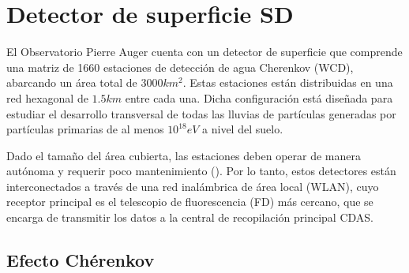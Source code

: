 \section{Detector de superficie SD}

El Observatorio Pierre Auger cuenta con un detector de superficie que comprende una matriz de 1660 estaciones de detección de agua Cherenkov (WCD), abarcando un área total de 3000$km^{2}$. Estas estaciones están distribuidas en una red hexagonal de $1.5km$ entre cada una. Dicha configuración está diseñada para estudiar el desarrollo transversal de todas las lluvias de partículas generadas por partículas primarias de al menos $10^{18} eV$ a nivel del suelo.

Dado el tamaño del área cubierta, las estaciones deben operar de manera autónoma y requerir poco mantenimiento (\cite{SD_auger}). Por lo tanto, estos detectores están interconectados a través de una red inalámbrica de área local (WLAN), cuyo receptor principal es el telescopio de fluorescencia (FD) más cercano, que se encarga de transmitir los datos a la central de recopilación principal CDAS.

\subsection{Efecto Chérenkov}

